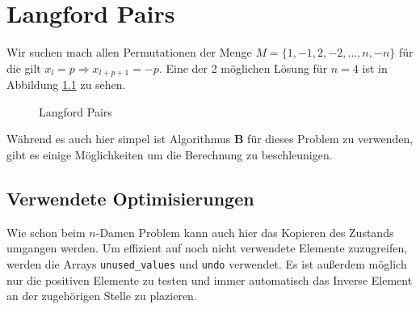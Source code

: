 \chapter{Langford Pairs}
Wir suchen mach allen Permutationen der Menge $M = \{1, -1, 2, -2, \dots, n, -n\}$ für die gilt $x_l = p \Rightarrow x_{l+p+1} = -p$.
Eine der 2 möglichen Lösung für $n = 4$ ist in Abbildung \ref{langford} zu sehen.
\begin{figure}
  \centering
  
  \caption{{Langford Pairs \cite{WikipediaEN:LFP}}}
  \label{langford}
\end{figure}
Während es auch hier simpel ist Algorithmus \textbf{B} für dieses Problem zu verwenden\cite[{src/langford.rs}]{Kauschke}, gibt es einige
Möglichkeiten um die Berechnung zu beschleunigen.

\section{Verwendete Optimisierungen}
Wie schon beim $n$-Damen Problem kann auch hier das Kopieren des Zustands umgangen werden. Um effizient auf noch nicht
verwendete Elemente zuzugreifen, werden die Arrays \texttt{unused_values} und \texttt{undo} verwendet.
Es ist außerdem möglich nur die positiven Elemente zu testen und immer automatisch das Inverse Element an der zugehörigen Stelle zu
plazieren.

